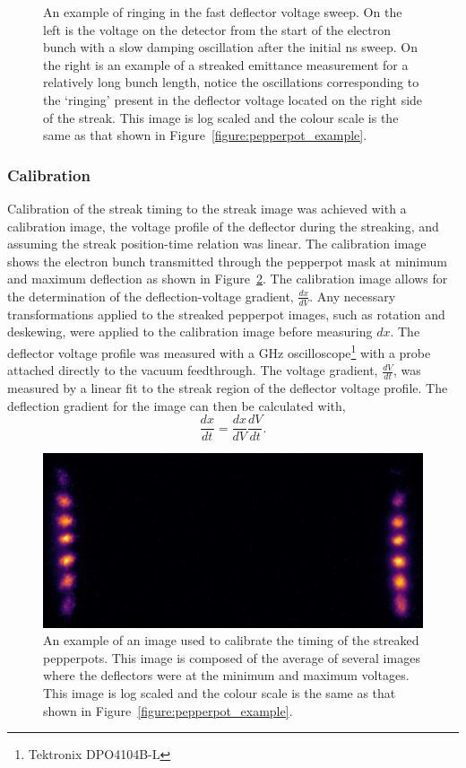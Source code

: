 \begin{figure}
    \center
    
    \caption[Streak deflector voltage oscillations.]{An example of ringing in the fast deflector voltage sweep. On the left is the voltage on the detector from the start of the electron bunch with a slow damping oscillation after the initial \unit[10]{ns} sweep. On the right is an example of a streaked emittance measurement for a relatively long bunch length, notice the oscillations corresponding to the `ringing' present in the deflector voltage located on the right side of the streak. This image is log scaled and the colour scale is the same as that shown in Figure~\ref{figure:pepperpot_example}.}
    \label{figure:ringing}
\end{figure}

\subsubsection{Calibration}
Calibration of the streak timing to the streak image was achieved with a calibration image, the voltage profile of the deflector during the streaking, and assuming the streak position-time relation was linear.
The calibration image shows the electron bunch transmitted through the pepperpot mask at minimum and maximum deflection as shown in Figure~\ref{figure:example_calibration}.
The calibration image allows for the determination of the deflection-voltage gradient, $\frac{dx}{dV}$.
Any necessary transformations applied to the streaked pepperpot images, such as rotation and deskewing, were applied to the calibration image before measuring $dx$.
The deflector voltage profile was measured with a \unit[1]{GHz} oscilloscope\footnote{Tektronix DPO4104B-L} with a probe attached directly to the vacuum feedthrough.
The voltage gradient, $\frac{dV}{dt}$, was measured by a linear fit to the streak region of the deflector voltage profile.
The deflection gradient for the image can then be calculated with,
\begin{equation}
\frac{dx}{dt} = \frac{dx}{dV} \frac{dV}{dt}.
\end{equation}

\begin{figure}
    \center
    \includegraphics[width=0.5\linewidth]{part2/Figs/example_calibration.jpeg}
    \caption[Streaked pepperpot calibration image.]{An example of an image used to calibrate the timing of the streaked pepperpots.
    This image is composed of the average of several images where the deflectors were at the minimum and maximum voltages. This image is log scaled and the colour scale is the same as that shown in Figure~\ref{figure:pepperpot_example}.}
    \label{figure:example_calibration}
\end{figure}

